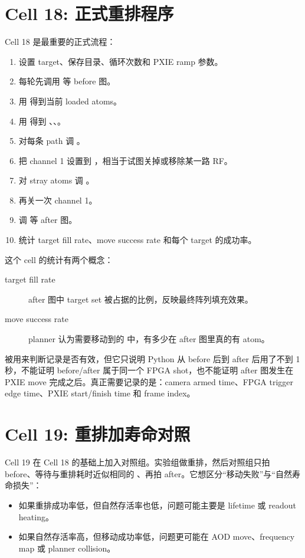 \documentclass[11pt,oneside,openany]{book}
\begin{document}
\section{Cell 18: 正式重排程序}
Cell 18 是最重要的正式流程：
\begin{enumerate}
  \item 设置 target、保存目录、循环次数和 PXIE ramp 参数。
  \item 每轮先调用  等 before 图。
  \item 用  得到当前 loaded atoms。
  \item 用  得到 、、。
  \item 对每条 path 调 。
  \item 把 channel 1 设置到 ，相当于试图关掉或移除某一路 RF。
  \item 对 stray atoms 调 。
  \item 再关一次 channel 1。
  \item 调  等 after 图。
  \item 统计 target fill rate、move success rate 和每个 target 的成功率。
\end{enumerate}

这个 cell 的统计有两个概念：
\begin{description}
  \item[target fill rate] after 图中 target set 被占据的比例，反映最终阵列填充效果。
  \item[move success rate] planner 认为需要移动到的  中，有多少在 after 图里真的有 atom。
\end{description}

\begin{notebox}[正式流程的同步弱点]
 被用来判断记录是否有效，但它只说明 Python 从 before 后到 after 后用了不到 1 秒，不能证明 before/after 属于同一个 FPGA shot，也不能证明 after 图发生在 PXIE move 完成之后。真正需要记录的是：camera armed time、FPGA trigger edge time、PXIE start/finish time 和 frame index。
\end{notebox}

\section{Cell 19: 重排加寿命对照}
Cell 19 在 Cell 18 的基础上加入对照组。实验组做重排，然后对照组只拍 before、等待与重排耗时近似相同的 、再拍 after。它想区分“移动失败”与“自然寿命损失”：
\begin{itemize}
  \item 如果重排成功率低，但自然存活率也低，问题可能主要是 lifetime 或 readout heating。
  \item 如果自然存活率高，但移动成功率低，问题更可能在 AOD move、frequency map 或 planner collision。
\end{itemize}
\end{document}
